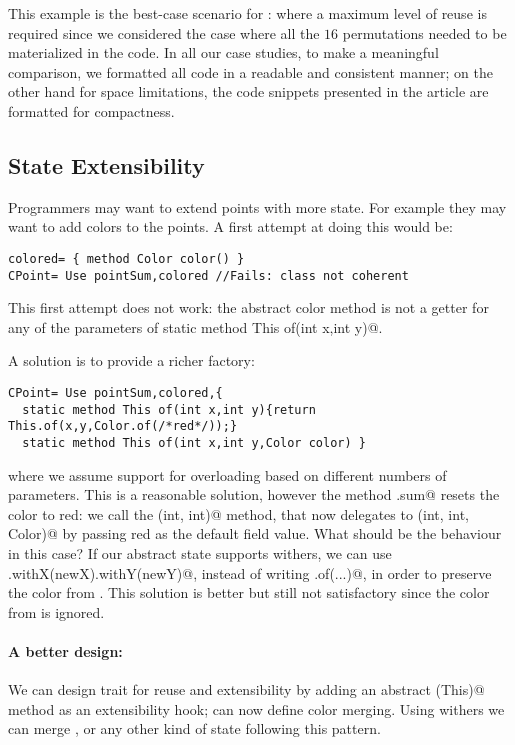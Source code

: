 This example is the best-case scenario for \name: where a maximum level of reuse
 is required since we considered the case where all the $16$ permutations needed to be materialized in the code.
In all our case studies, to make a meaningful comparison, we formatted all code in a readable and consistent manner;
on the other hand for space limitations, the code snippets presented in the article
are formatted for compactness.


\subsection{State Extensibility}

Programmers may want to extend points with more state. For example 
they may want to add colors to the points. A first attempt at doing
this would be:

\begin{lstlisting}
colored= { method Color color() }
CPoint= Use pointSum,colored //Fails: class not coherent
\end{lstlisting}
 
This first attempt does not work: the abstract color method
is not a getter for any of the parameters of 
\Q@ static method This of(int x,int y)@. 

\noindent
A solution is to provide a richer factory:
 
\begin{lstlisting}
CPoint= Use pointSum,colored,{
  static method This of(int x,int y){return This.of(x,y,Color.of(/*red*/));}
  static method This of(int x,int y,Color color) }
\end{lstlisting}
 
\noindent 
where we assume support for overloading based on different numbers of parameters.
This is a reasonable solution, however the method \Q@CPoint.sum@ resets
the color to red: we call the \Q@of(int, int)@ method, that now
delegates to \Q@of(int, int, Color)@ by passing red as the default field
value.  What should be the behaviour in this case?  If our abstract
state supports withers, we can use
\Q@this.withX(newX).withY(newY)@, instead of writing \Q@This.of(...)@, in order to preserve the color from
\Q@this@.  This solution is better but still not satisfactory since the color from \Q@that@ is ignored.

\paragraph{A better design:}
We can design trait \Q@p@ for reuse and extensibility
by adding an abstract \Q@merge(This)@ method as an extensibility hook;
\Q@colored@ can now define color merging.
Using withers we can merge \Q@color@s, or any other kind of state 
following this pattern.%


